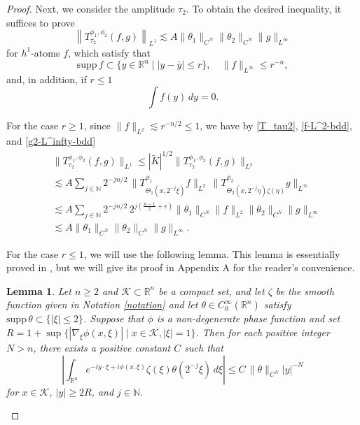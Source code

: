 \documentclass[12pt]{amsart}
\numberwithin{equation}{section}
\theoremstyle{plain}
\newtheorem{lem}[thm]{Lemma}
\theoremstyle{definition}
\newcommand{\N}{\mathbb{N}}
\newcommand{\R}{\mathbb{R}}
\newcommand{\calK}{\mathcal{K}}
\newcommand{\supp}{\mathrm{supp}\, }
\begin{document}
\begin{proof}
Next, we consider the amplitude
$\tau_2$.
To obtain the desired inequality, 
it suffices to prove
\[
\left\|
T_{\tau_2}^{\phi_1, \phi_2} (f, g) 
\right\|_{L^1}
\lesssim 
A
\|\theta_1\|_{C^{N}}
\|\theta_2\|_{C^{N}}
 \|g\|_{L^{\infty}}
\]
for $h^1$-atoms $f$, which satisfy that
\[
\supp f \subset \{ y \in \R^n \mid |y - \bar{y}| \le r \} , 
\quad 
\|f\|_{L^{\infty}}\le r^{-n}, 
\]
and, in addition, if $r \le 1$
\[
\int f(y)\, dy = 0.
\]


For the case $r \ge 1$,
since $\|f\|_{L^2} \lesssim r^{-n/2} \le 1$,
we have by
\eqref{T_tau2},
\eqref{f-L^2-bdd}, and
\eqref{g2-L^infty-bdd}
\begin{align*}&
\| T_{ \tau_2 }^{\phi_1, \phi_2} (f, g) \|_{L^1}
\le
| \widetilde{K} |^{1/2}
\| T_{ \tau_2 }^{\phi_1, \phi_2} (f, g) \|_{L^2}
\\&\lesssim A
\sum_{j \in \N } 
2^{-j n/2} \,
\| T^{\phi_1}_{ \Theta_1 (x, 2^{-j} \xi) } f \|_{L^2} \,
\| T^{\phi_2}_{ \Theta_2 (x, 2^{-j} \eta) \zeta(\eta) } g \|_{L^{\infty}} 
\\&\lesssim A
\sum_{j \in \N } 
2^{-j n/2} \, 2^{j(\frac{n-1}{2} + \epsilon)} 
\| \theta_1 \|_{ C^N } \|f\|_{L^2}
\| \theta_2 \|_{ C^N } \|g\|_{L^\infty}
\\&\lesssim A
\| \theta_1 \|_{ C^N } \| \theta_2 \|_{ C^N } 
\|g\|_{L^\infty} .
\end{align*}


For the case $r \le 1$, we will use the following lemma.
This lemma is essentially proved in \cite[Lemma 4.4]{KMT},
but we will give its proof in Appendix A
for the reader's convenience.
\begin{lem}\label{lem-D3} 
Let $n\ge 2$ and $\calK \subset \R^n$ be a compact set, 
and let $\zeta$ be the smooth function 
given in Notation \ref{notation} 
and let 
$\theta \in C_{0}^{\infty} (\R^{n})$ 
satisfy $\supp \theta \subset \{|\xi|\le 2\}$.
Suppose that 
$\phi$ is a non-degenerate phase function 
and set 
$R = 1+ \sup \big\{ |\nabla_{\xi} \phi (x, \xi)| \mid x \in \calK, |\xi|=1 \big\}$.  
Then for each positive integer $N>n$, 
there  exists a positive constant $C$
such that 
\[
\left| \int_{\R^n} e^{-i y \cdot \xi + i \phi (x, \xi)} 
\zeta(\xi) \theta (2^{-j}\xi) \,d\xi \right| 
\le C \,
\|\theta\|_{C^N} |y|^{-N} 
\]
for $x \in \calK$, $|y| \ge 2R$, and $j\in \N$. 
\end{lem}


\end{proof}
\end{document}
